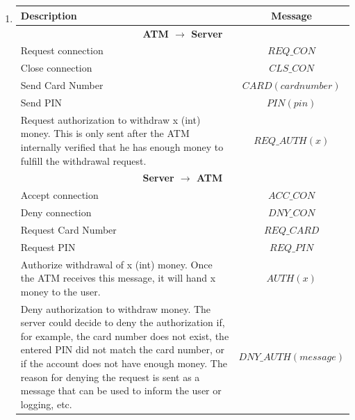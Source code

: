 \documentclass[12pt, a4paper]{article}
\begin{document}
\section{} %
\begin{enumerate}[a]
	\item %
	\begin{tabular}{|p{20em}|c|}
		\hline
		\textbf{Description} & \textbf{Message}\\\hline
		\multicolumn{2}{|c|}{\textbf{ATM $\rightarrow$ Server}}\\\hline
		Request connection & $REQ\_CON$\\\hline
		Close connection & $CLS\_CON$\\\hline
		Send Card Number & $CARD(card number)$\\\hline
		Send PIN & $PIN(pin)$\\\hline
		Request authorization to withdraw x (int) money. This is only sent after the ATM internally verified that he has enough money to fulfill the withdrawal request. & $REQ\_AUTH(x)$\\\hline

		\multicolumn{2}{|c|}{\textbf{Server $\rightarrow$ ATM}}\\\hline
		Accept connection & $ACC\_CON$\\\hline
		Deny connection & $DNY\_CON$\\\hline
		Request Card Number & $REQ\_CARD$\\\hline
		Request PIN & $REQ\_PIN$\\\hline
		Authorize withdrawal of x (int) money. Once the ATM receives this message, it will hand x money to the user. & $AUTH(x)$\\\hline
		Deny authorization to withdraw money. The server could decide to deny the authorization if, for example, the card number does not exist, the entered PIN did not match the card number, or if the account does not have enough money. The reason for denying the request is sent as a message that can be used to inform the user or logging, etc. & $DNY\_AUTH(message)$\\\hline
	\end{tabular}


\end{enumerate}
\end{document}
